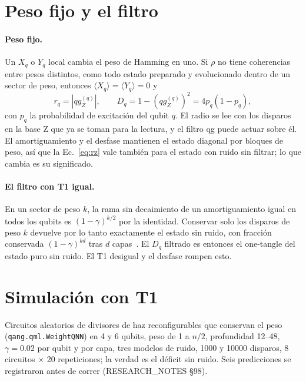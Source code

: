 \documentclass[11pt]{article}
\newcommand{\qZ}{qg_Z}
\begin{document}
\section{Peso fijo y el filtro}

\paragraph{Peso fijo.} Un $X_q$ o $Y_q$ local cambia el peso de Hamming en uno. Si $\rho$ no tiene coherencias entre
pesos distintos, como todo estado preparado y evolucionado dentro de un sector de peso, entonces $\langle
X_q\rangle=\langle Y_q\rangle=0$ y
\begin{equation}\label{eq:rz}
r_q=|\qZ^{(q)}|,\qquad D_q=1-(\qZ^{(q)})^2=4p_q(1-p_q),
\end{equation}
con $p_q$ la probabilidad de excitación del qubit $q$. El radio se lee con los disparos en la base Z que ya se toman para
la lectura, y el filtro qg puede actuar sobre él. El amortiguamiento y el desfase mantienen el estado diagonal por
bloques de peso, así que la Ec.~\eqref{eq:rz} vale también para el estado con ruido sin filtrar; lo que cambia es su
significado.

\paragraph{El filtro con T1 igual.} En un sector de peso $k$, la rama sin decaimiento de un amortiguamiento igual en
todos los qubits es $(1-\gamma)^{k/2}$ por la identidad. Conservar solo los disparos de peso $k$ devuelve por lo tanto
exactamente el estado sin ruido, con fracción conservada $(1-\gamma)^{kd}$ tras $d$ capas~\cite{monteverde2026qml}. El
$D_q$ filtrado es entonces el one-tangle del estado puro sin ruido. El T1 desigual y el desfase rompen esto.

\section{Simulación con T1}

Circuitos aleatorios de divisores de haz reconfigurables que conservan el peso (\texttt{qang.qml.WeightQNN}) en 4 y 6
qubits, peso de 1 a $n/2$, profundidad 12--48, $\gamma=0.02$ por qubit y por capa, tres modelos de ruido, 1000 y 10000
disparos, 8 circuitos $\times$ 20 repeticiones; la verdad es el déficit sin ruido. Seis predicciones se registraron
antes de correr (RESEARCH\_NOTES \S98).
\end{document}
